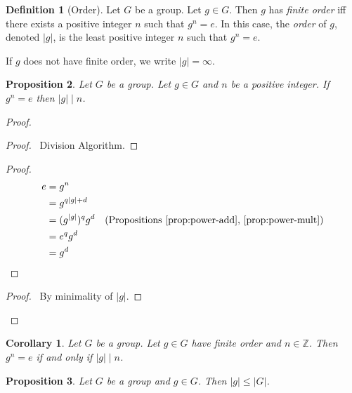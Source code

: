 \documentclass{book}
\let\qed\relax
\newtheorem{prop}{Proposition}[chapter]
\newtheorem{cor}{Corollary}[prop]
\theoremstyle{definition}
\newtheorem{df}[prop]{Definition}
\begin{document}
\begin{df}[Order]
    Let $G$ be a group. Let $g \in G$. Then $g$ has \emph{finite order} iff there exists a positive integer $n$ such that $g^n = e$. In this case, the \emph{order} of $g$, denoted $|g|$, is the least positive integer $n$ such that $g^n = e$.

    If $g$ does not have finite order, we write $|g| = \infty$.
\end{df}

\begin{prop}
    Let $G$ be a group. Let $g \in G$ and $n$ be a positive integer. If $g^n = e$ then $|g| \mid n$.
\end{prop}

\begin{proof}
    \pf
    \begin{proof}
        \pf\ Division Algorithm.
    \end{proof}
    \begin{proof}
        \pf
        \begin{align*}
            e & = g^n                                                                                 \\
              & = g^{q|g| + d}                                                                        \\
              & = (g^{|g|})^q g^d & (\text{Propositions \ref{prop:power-add}, \ref{prop:power-mult}}) \\
              & = e^q g^d                                                                             \\
              & = g^d
        \end{align*}
    \end{proof}
    \begin{proof}
        \pf\ By minimality of $|g|$.
    \end{proof}
    \qed
\end{proof}

\begin{cor}
    \label{cor:order-divides}
    Let $G$ be a group. Let $g \in G$ have finite order and $n \in \mathbb{Z}$. Then $g^n = e$ if and only if $|g| \mid n$.
\end{cor}

\begin{prop}
    Let $G$ be a group and $g \in G$. Then $|g| \leq |G|$.
\end{prop}
\end{document}
